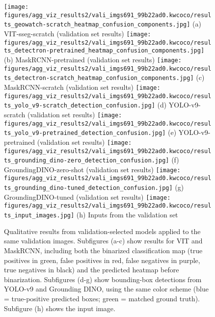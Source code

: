 \newcommand{\FP}{\textcolor{fpred}{false positive}}
\newcommand{\TPpred}{\textcolor{tppred}{true-positive prediction}}
\newcommand{\FN}{\textcolor{fntrue}{false negative}}
\newcommand{\TPtrue}{\textcolor{tptrue}{true positive (GT)}}
\newcommand{\TN}{\textcolor{neutral}{true negative}}


\begin{figure*}[ht]
\centering
\texttt{[image: figures/agg\_viz\_results2/vali\_imgs691\_99b22ad0.kwcoco/results\_geowatch-scratch\_heatmap\_confusion\_components.jpg]}%
\hfill
(a) VIT-sseg-scratch (validation set results)
\texttt{[image: figures/agg\_viz\_results2/vali\_imgs691\_99b22ad0.kwcoco/results\_detectron-pretrained\_heatmap\_confusion\_components.jpg]}%
\hfill
(b) MaskRCNN-pretrained (validation set results)
\texttt{[image: figures/agg\_viz\_results2/vali\_imgs691\_99b22ad0.kwcoco/results\_detectron-scratch\_heatmap\_confusion\_components.jpg]}%
\hfill
(c) MaskRCNN-scratch (validation set results)
\texttt{[image: figures/agg\_viz\_results2/vali\_imgs691\_99b22ad0.kwcoco/results\_yolo\_v9-scratch\_detection\_confusion.jpg]}%
\hfill
(d) YOLO-v9-scratch (validation set results)
\texttt{[image: figures/agg\_viz\_results2/vali\_imgs691\_99b22ad0.kwcoco/results\_yolo\_v9-pretrained\_detection\_confusion.jpg]}%
\hfill
(e) YOLO-v9-pretrained (validation set results)
\texttt{[image: figures/agg\_viz\_results2/vali\_imgs691\_99b22ad0.kwcoco/results\_grounding\_dino-zero\_detection\_confusion.jpg]}%
\hfill
(f) GroundingDINO-zero-shot (validation set results)
\texttt{[image: figures/agg\_viz\_results2/vali\_imgs691\_99b22ad0.kwcoco/results\_grounding\_dino-tuned\_detection\_confusion.jpg]}%
\hfill
(g) GroundingDINO-tuned (validation set results)
\texttt{[image: figures/agg\_viz\_results2/vali\_imgs691\_99b22ad0.kwcoco/results\_input\_images.jpg]}%
\hfill
(h) Inputs from the validation set
\caption[]{
    Qualitative results from validation-selected models applied to the same validation images.
    Subfigures (a-c) show results for VIT and MaskRCNN, including both the binarized classification map 
    (\textcolor{tptrue}{true positives in green}, 
     \textcolor{fpred}{false positives in red}, 
     \textcolor{fntrue}{false negatives in purple}, 
     \textcolor{neutral}{true negatives in black}) 
    and the predicted heatmap before binarization.  
    Subfigures (d-g) show bounding-box detections from YOLO-v9 and Grounding DINO, using the same color scheme 
    (\textcolor{tppred}{blue = true-positive predicted boxes}; 
     \textcolor{tptrue}{green = matched ground truth}).
    Subfigure (h) shows the input image.
}
\label{fig:vali_results_all_models}
\end{figure*}

